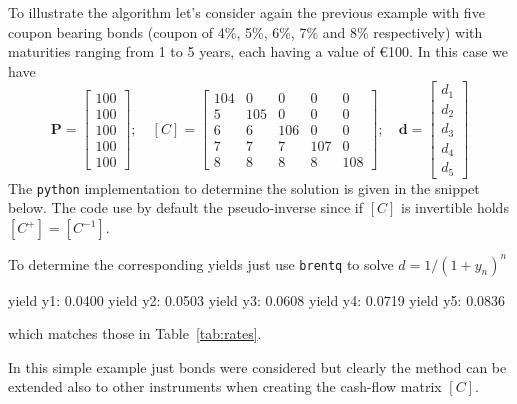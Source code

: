 To illustrate the algorithm let's consider again the previous example with five coupon bearing bonds (coupon of 4\%, 5\%, 6\%, 7\% and 8\% respectively) with maturities ranging from 1 to 5 years, each having a value of \euro{100}. In this case we have
\begin{equation*}
\boldsymbol{P} =
\begin{bmatrix}
100 \\
100 \\
100 \\
100 \\
100
\end{bmatrix}; \quad
[C] =
\begin{bmatrix}
104 & 0 & 0 & 0 & 0 \\
5 & 105 & 0 & 0 & 0 \\
6 & 6 & 106 & 0 & 0 \\
7 & 7 & 7 & 107 & 0 \\
8 & 8 & 8 & 8 & 108
\end{bmatrix}; \quad \boldsymbol{d} =
\begin{bmatrix}
d_1 \\
d_2 \\
d_3 \\
d_4 \\
d_5
\end{bmatrix}
\end{equation*}
The \texttt{python} implementation to determine the solution is given in the snippet below. The code use by default the pseudo-inverse since if $[C]$ is invertible holds $[C^+] = [C^{-1}]$.


\begin{ioutput}
[0.96153846 0.90659341 0.83765291 0.75756548 0.66938146]
\end{ioutput}
To determine the corresponding yields just use \texttt{brentq} to solve $d=1/(1+y_n)^{n}$

\begin{ioutput}
yield y1: 0.0400
yield y2: 0.0503
yield y3: 0.0608
yield y4: 0.0719
yield y5: 0.0836
\end{ioutput}
which matches those in Table~\ref{tab:rates}.

In this simple example just bonds were considered but clearly the method can be extended also to other instruments when creating the cash-flow matrix $[C]$.

%

